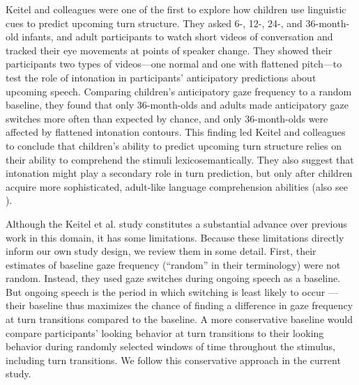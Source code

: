 \documentclass[authoryear, 12pt]{elsarticle}
\begin{document}


Keitel and colleagues \citeyearpar{keitel2013} were one of the first to explore how children use linguistic cues to predict upcoming turn structure. They asked 6-, 12-, 24-, and 36-month-old infants, and adult participants to watch short videos of conversation and tracked their eye movements at points of speaker change. They showed their participants two types of videos---one normal and one with flattened pitch---to test the role of intonation in participants' anticipatory predictions about upcoming speech. Comparing children's anticipatory gaze frequency to a random baseline, they found that only 36-month-olds and adults made anticipatory gaze switches more often than expected by chance, and only 36-month-olds were affected by flattened intonation contours. This finding led Keitel and colleagues to conclude that children's ability to predict upcoming turn structure relies on their ability to comprehend the stimuli lexicosemantically. They also suggest that intonation might play a secondary role in turn prediction, but only after children acquire more sophisticated, adult-like language comprehension abilities (also see \citealp{keitel2015}).

Although the Keitel et al. \citeyearpar{keitel2013} study constitutes a substantial advance over previous work in this domain, it has some limitations. Because these limitations directly inform our own study design, we review them in some detail. First, their estimates of baseline gaze frequency (``random'' in their terminology) were not random. Instead, they used gaze switches during ongoing speech as a baseline. But ongoing speech is the period in which switching is least likely to occur \citep{hirvenkari2013}---their baseline thus maximizes the chance of finding a difference in gaze frequency at turn transitions compared to the baseline. A more conservative baseline would compare participants' looking behavior at turn transitions to their looking behavior during randomly selected windows of time throughout the stimulus, including turn transitions. We follow this conservative approach in the current study.
\end{document}
